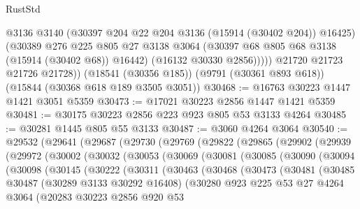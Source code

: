 \begin{lexlean}{RustStd}
\begin{coremodule}
              @3136
              @3140
              (@30397 @204 @22 @204 @3136 (@15914 (@30402 @204)) @16425)
              (@30389
                @276
                @225
                @805
                @27
                @3138
                @3064
                (@30397 @68 @805 @68 @3138 (@15914 (@30402 @68)) @16442)
                (@16132 @30330 @2856)))))
        @21720
        @21723
        @21726
        @21728))
    (@18541 (@30356 @185))
    (@9791 (@30361 @893 @618))
    (@15844 (@30368 @618 @189 @3505 @3051))
@30468 := @16763 @30223 @1447 @1421 @3051 @5359
@30473 := @17021 @30223 @2856 @1447 @1421 @5359
@30481 := @30175 @30223 @2856 @223 @923 @805 @53 @3133 @4264
@30485 := @30281 @1445 @805 @55 @3133
@30487 := @3060 @4264 @3064
@30540 := @29532
    (@29641
      (@29687
        (@29730
          (@29769
            (@29822
              (@29865
                (@29902
                  (@29939
                    (@29972
                      (@30002
                        (@30032
                          (@30053
                            (@30069
                              (@30081
                                (@30085
                                  (@30090
                                    (@30094
                                      (@30098
                                        (@30145
                                          (@30222
                                            (@30311
                                              (@30463
                                                (@30468
                                                  (@30473
                                                    (@30481
                                                      (@30485
                                                        @30487
                                                        (@30289 @3133 @30292 @16408)
                                                        (@30280
                                                          @923
                                                          @225
                                                          @53
                                                          @27
                                                          @4264
                                                          @3064
                                                          (@20283
                                                            @30223
                                                            @2856
                                                            @920
                                                            @53

\end{coremodule}
\end{lexlean}
